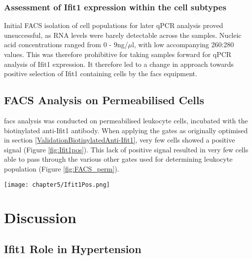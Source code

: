 \subsubsection{Assessment of Ifit1 expression within the cell subtypes}

Initial FACS isolation of cell populations for later qPCR analysis proved unsuccessful, as RNA levels were barely detectable across the samples. Nucleic acid concentrations ranged from 0 - 9ng/$\mu$l, with low accompanying 260:280 values. This was therefore prohibitive for taking samples forward for qPCR analysis of Ifit1 expression. It therefore led to a change in approach towards positive selection of Ifit1 containing cells by the \acrshort{facs} equipment.

\subsection{FACS Analysis on Permeabilised Cells}

\acrshort{facs} analysis was conducted on permeabilised leukocyte cells, incubated with the biotinylated anti-Ifit1 antibody. When applying the gates as originally optimised in section \ref{ValidationBiotinylatedAnti-Ifit1}, very few cells showed a positive signal (Figure \ref{fig:Ifit1pos}). This lack of positive signal resulted in very few cells able to pass through the various other gates used for determining leukocyte population (Figure \ref{fig:FACS_perm}). \\

\begin{figure*}[!htbp]
\centering
\texttt{[image: chapter5/Ifit1Pos.png]}
\caption[\acrfull{facs} output of BV605 Positive cells (Stained with anti-Ifit1 antibodies)]{\acrfull{facs} output of BV605 Positive cells (Stained with anti-Ifit1 antibodies), illustrating how few yielded a positive signal.}
\label{fig:Ifit1pos}
\end{figure*}




\section{Discussion}

\subsection{Ifit1 Role in Hypertension}

